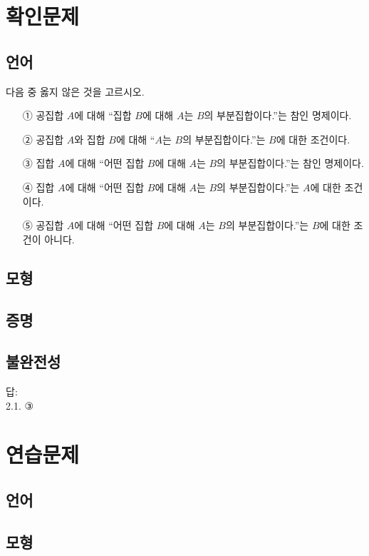\documentclass{../../large}
\begin{document}
\twocolumn
\section*{확인문제}

\subsection*{언어}
\begin{problem}
다음 중 옳지 않은 것을 고르시오.
\begin{enumerate}
\item[①] 공집합 $A$에 대해 ``집합 $B$에 대해 $A$는 $B$의 부분집합이다.''는 참인 명제이다.
\item[②] 공집합 $A$와 집합 $B$에 대해 ``$A$는 $B$의 부분집합이다.''는 $B$에 대한 조건이다.
\item[③] 집합 $A$에 대해 ``어떤 집합 $B$에 대해 $A$는 $B$의 부분집합이다.''는 참인 명제이다.
\item[④] 집합 $A$에 대해 ``어떤 집합 $B$에 대해 $A$는 $B$의 부분집합이다.''는 $A$에 대한 조건이다.
\item[⑤] 공집합 $A$에 대해 ``어떤 집합 $B$에 대해 $A$는 $B$의 부분집합이다.''는 $B$에 대한 조건이 아니다.
\end{enumerate}
\end{problem}
\subsection*{모형}
\subsection*{증명}
\subsection*{불완전성}





답:\\
2.1. ③


\onecolumn
\section*{연습문제}

\subsection*{언어}
\subsection*{모형}
\end{document}
